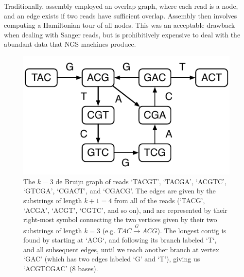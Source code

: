 \documentclass[a4paper,11pt]{article}
\begin{document}
Traditionally, assembly employed an overlap graph, where each read is a node, and an edge exists if two reads have sufficient overlap. Assembly then involves computing a Hamiltonian tour of all nodes. This was an acceptable drawback when dealing with Sanger reads, but is prohibitively expensive to deal with the abundant data that NGS machines produce.



\begin{figure}
	\begin{center}
		\includegraphics[scale=0.8]{images/dbg.pdf}
		\caption{The $k=3$ de Bruijn graph of reads `TACGT', `TACGA', `ACGTC', `GTCGA', `CGACT', and
			`CGACG'. The edges are given by the substrings of length $k+1=4$ from all of the reads (`TACG', `ACGA', `ACGT', `CGTC', and so on), and are represented by their right-most symbol connecting the two vertices  given by their two substrings of length $k=3$ (e.g. $TAC \xrightarrow{G} ACG$). The longest contig is found by starting at `ACG`, and following its branch labeled `T`, and all subsequent edges, until we reach another branch at vertex `GAC' (which has two edges labeled `G' and `T'), giving us `ACGTCGAC' ($8$ bases).}
		\label{figure:dbg}
	\end{center}
\end{figure}
\end{document}
